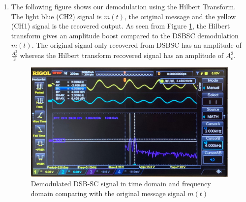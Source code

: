 \documentclass[11pt]{article}
\begin{document}
\begin{enumerate}[label=(\alph*)]
\item %
The following figure shows our demodulation using the Hilbert Transform. The light blue (CH2) signal is $m(t)$, the original message and the yellow (CH1) signal is the recovered output. As seen from Figure \ref{fig:q3e}, the Hilbert transform gives an amplitude boost compared to the DSBSC demodulation $m(t)$. The original signal only recovered from DSBSC has an amplitude of $\frac{A_c^2}{2}$ whereas the Hilbert transform recovered signal has an amplitude of $A_c^2$.
\begin{figure}[H]
    \centering
    \includegraphics[scale = 0.20]{Q3e.jpg}
    \caption{\label{fig:q3e}Demodulated DSB-SC signal in time domain and frequency domain comparing with the original message signal $m(t)$}
\end{figure}
\end{enumerate}

\end{document}
